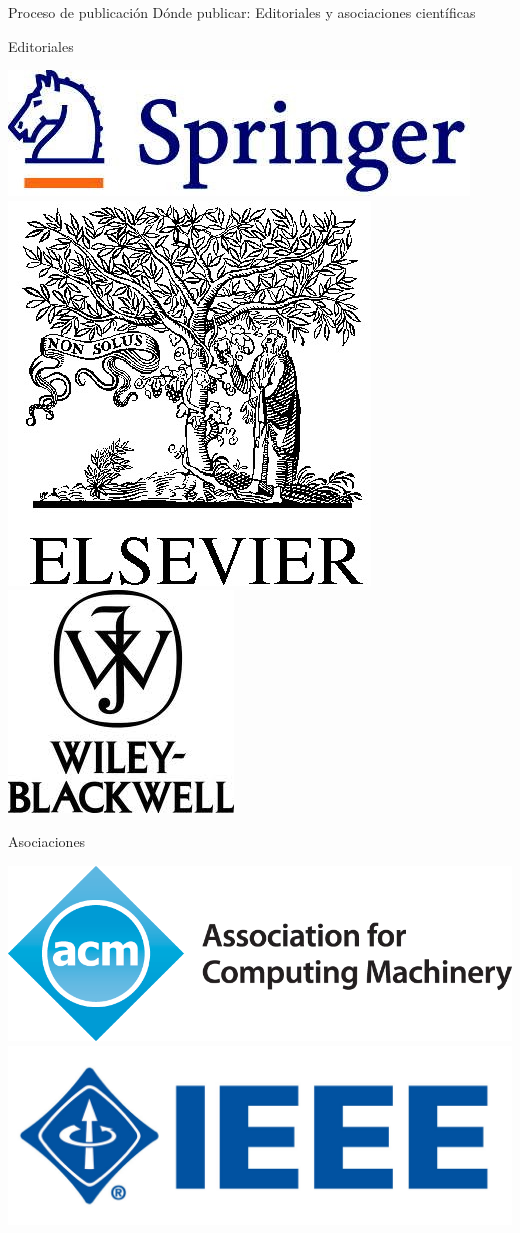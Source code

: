 \documentclass{beamer}
\begin{document}
\begin{frame}{Proceso de publicación} {Dónde publicar: Editoriales y asociaciones científicas}
	\begin{block}{Editoriales}
	\begin{center}
  		\begin{center}
      	\includegraphics[width=0.3\linewidth]{figs/springer.jpg}\hspace{1cm}
      	\includegraphics[width=0.2\linewidth]{figs/elsevier.jpg}\hspace{1cm}
      	\includegraphics[width=0.2\linewidth]{figs/wiley.jpg}
	    \end{center}
	\end{center}
	\end{block}

	\begin{block}{Asociaciones}
  		\begin{center}
      	\includegraphics[width=0.3\linewidth]{figs/acm.png}\hspace{1cm}
      	\includegraphics[width=0.3\linewidth]{figs/ieee.jpg}
	    \end{center}
	\end{block}
\end{frame}
\end{document}
